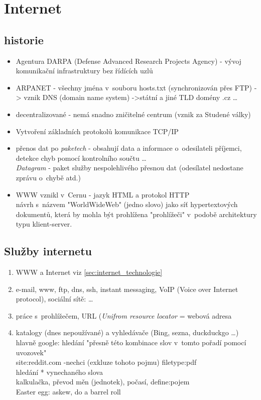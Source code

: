 \documentclass[12pt]{article}
\begin{document}
\section{Internet}
\subsection{historie}
\begin{itemize}
\item Agentura DARPA (Defense Advanced Research Projects Agency) - vývoj komunikační infrastruktury bez řídících uzlů
\item ARPANET - všechny jména v~souboru hosts.txt (synchronizován přes FTP) -> vznik DNS (domain name system) ->státní a jiné TLD domény .cz \dots 
\item decentralizované - nemá snadno zničitelné centrum (vznik za Studené války)
\item Vytvoření základních protokolů komunikace TCP/IP
\item přenos dat po \emph{paketech} - obsahují data a informace o~odesilateli příjemci, detekce chyb pomocí kontrolního součtu \dots \\
\emph{Datagram} - paket služby nespolehlivého přesnou dat (odesílatel nedostane zprávu o~chybě atd.)
\item WWW vznikl v~Cernu - jazyk HTML a protokol HTTP\\
návrh s~názvem "WorldWideWeb" (jedno slovo) jako síť hypertextových dokumentů, která by mohla být prohlížena "prohlížeči" v~podobě architektury typu klient-server.
\end{itemize}
\subsection{Služby internetu}
\begin{enumerate}
\item WWW a Internet viz \ref{sec:internet_technologie}
\item e-mail, www, ftp, dns, ssh, instant messaging, VoIP (Voice over Internet protocol), sociální sítě: \dots
\item práce s~prohlížečem, URL (\emph{Unifrom resource locator} = webová adresa
\item katalogy (dnes nepoužívané) a vyhledávače  (Bing, sezna, duckduckgo \dots) hlavně google:
hledání "přesně této kombinace slov v~tomto pořadí pomocí uvozovek"\\
site:reddit.com \qquad -nechci (exkluze tohoto pojmu) \qquad filetype:pdf\\
hledání * vynechaného slova\\
kalkulačka, převod měn (jednotek), počasí, define:pojem\\
Easter egg: askew, do a barrel roll
\end{enumerate}
\end{document}
